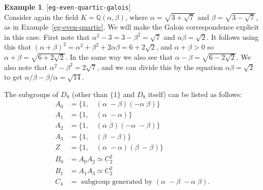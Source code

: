 \documentclass{amsart}
\newcommand{\lbl}[1]{\label{#1}\textup{[\texttt{#1}]}\ \\}
\newcommand{\lbl}{\label}
\newcommand{\Q}         {{\mathbb{Q}}}
\newcommand{\al}        {\alpha}
\newcommand{\bt}        {\beta}
\renewcommand{\:}{\colon}
\theoremstyle{definition}
\newtheorem{example}[theorem]{Example}
\begin{document}
\begin{example}\lbl{eg-even-quartic-galois}
 Consider again the field $K=\Q(\al,\bt)$, where
 $\al=\sqrt{3+\sqrt{7}}$ and $\bt=\sqrt{3-\sqrt{7}}$, as in
 Example~\ref{eg-even-quartic}.  We will make the Galois
 correspondence explicit in this case.  First note that
 $\al^2-3=3-\bt^2=\sqrt{7}$ and $\al\bt=\sqrt{2}$.  It follows using
 this that $(\al+\bt)^2=\al^2+\bt^2+2\al\bt=6+2\sqrt{2}$, and
 $\al+\bt>0$ so $\al+\bt=\sqrt{6+2\sqrt{2}}$.  In the same way we also
 see that $\al-\bt=\sqrt{6-2\sqrt{2}}$.  We also note that
 $\al^2-\bt^2=2\sqrt{7}$, and we can divide this by the equation
 $\al\bt=\sqrt{2}$ to get $\al/\bt-\bt/\al=\sqrt{14}$.

 The subgroups of $D_8$ (other than $\{1\}$ and $D_8$ itself) can be
 listed as follows:
 \begin{align*}
  A_0 &= \{1,\quad (\al\; -\bt)(-\al\;\bt)\} \\
  A_1 &= \{1,\quad (\al\; -\al)\} \\
  A_2 &= \{1,\quad (\al\; \bt)(-\al\;-\bt)\} \\
  A_3 &= \{1,\quad (\bt\; -\bt)\} \\
  Z   &= \{1,\quad (\al\; -\al)(\bt\; -\bt)\} \\
  B_0 &= A_0A_2 \simeq C_2^2 \\
  B_1 &= A_1A_3 \simeq C_2^2 \\
  C_4 &= \text{ subgroup generated by } (\al\; -\bt\; -\al\; \bt).
 \end{align*}
 

\end{example}
\end{document}

